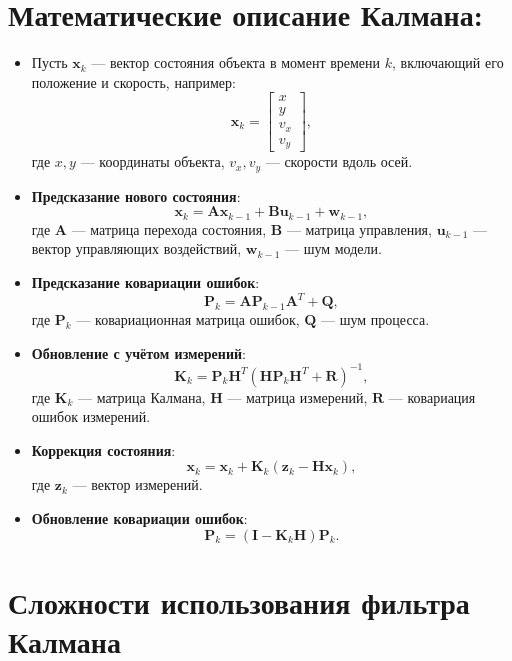 \section{Математические описание Калмана:}

\begin{itemize}
    \item Пусть \( \mathbf{x}_k \) — вектор состояния объекта в момент времени \( k \), включающий его положение и скорость, например:
    \[
    \mathbf{x}_k = \begin{bmatrix} x \\ y \\ v_x \\ v_y \end{bmatrix},
    \]
    где \( x, y \) — координаты объекта, \( v_x, v_y \) — скорости вдоль осей.

    \item \textbf{Предсказание нового состояния}:
    \[
    \mathbf{x}_k = \mathbf{A} \mathbf{x}_{k-1} + \mathbf{B} \mathbf{u}_{k-1} + 
	\mathbf{w}_{k-1},
    \]
    где \( \mathbf{A} \) — матрица перехода состояния, \( \mathbf{B} \) — матрица 
	управления, \( \mathbf{u}_{k-1} \) — вектор управляющих воздействий, 
	\( \mathbf{w}_{k-1} \) — шум модели.
    
    \item \textbf{Предсказание ковариации ошибок}:
    \[
    \mathbf{P}_k = \mathbf{A} \mathbf{P}_{k-1} \mathbf{A}^T + \mathbf{Q},
    \]
    где \( \mathbf{P}_k \) — ковариационная матрица ошибок, \( \mathbf{Q} \) — шум процесса.

    
    \item \textbf{Обновление с учётом измерений}:
    \[
    \mathbf{K}_k = \mathbf{P}_k \mathbf{H}^T (\mathbf{H} \mathbf{P}_k \mathbf{H}^T + \mathbf{R})^{-1},
    \]
    где \( \mathbf{K}_k \) — матрица Калмана, \( \mathbf{H} \) — матрица измерений, 
	\( \mathbf{R} \) — ковариация ошибок измерений.
    
    \item \textbf{Коррекция состояния}:
    \[
    \mathbf{x}_k = \mathbf{x}_k + \mathbf{K}_k (\mathbf{z}_k - \mathbf{H} \mathbf{x}_k),
    \]
    где \( \mathbf{z}_k \) — вектор измерений.
    
    \item \textbf{Обновление ковариации ошибок}:
    \[
    \mathbf{P}_k = (\mathbf{I} - \mathbf{K}_k \mathbf{H}) \mathbf{P}_k.
    \]
\end{itemize}

\section{Сложности использования фильтра Калмана}

